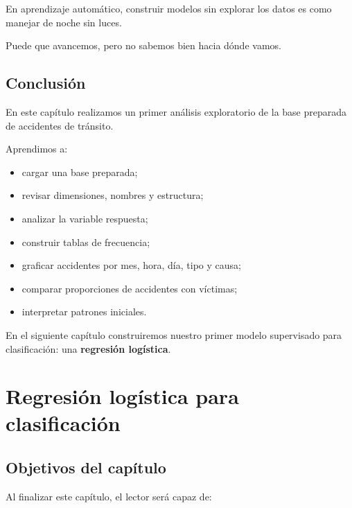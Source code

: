 \documentclass[
  11pt,
  letterpaper,
]{book}
\providecommand{\tightlist}{%
  \setlength{\itemsep}{0pt}\setlength{\parskip}{0pt}}
\begin{document}
En aprendizaje automático, construir modelos sin explorar los datos es
como manejar de noche sin luces.

Puede que avancemos, pero no sabemos bien hacia dónde vamos.

\section{Conclusión}\label{conclusiuxf3n-1}

En este capítulo realizamos un primer análisis exploratorio de la base
preparada de accidentes de tránsito.

Aprendimos a:

\begin{itemize}
\tightlist
\item
  cargar una base preparada;
\item
  revisar dimensiones, nombres y estructura;
\item
  analizar la variable respuesta;
\item
  construir tablas de frecuencia;
\item
  graficar accidentes por mes, hora, día, tipo y causa;
\item
  comparar proporciones de accidentes con víctimas;
\item
  interpretar patrones iniciales.
\end{itemize}

En el siguiente capítulo construiremos nuestro primer modelo supervisado
para clasificación: una \textbf{regresión logística}.


\chapter{Regresión logística para
clasificación}\label{regresiuxf3n-loguxedstica-para-clasificaciuxf3n}

\section{Objetivos del capítulo}\label{objetivos-del-capuxedtulo-3}

Al finalizar este capítulo, el lector será capaz de:
\end{document}
